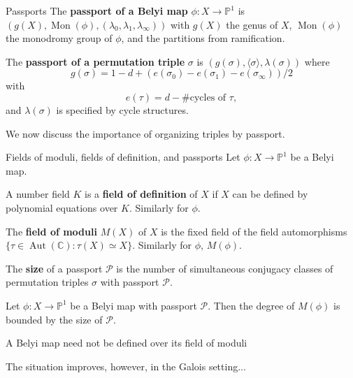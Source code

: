 \documentclass[xcolor=dvipsnames]{beamer}
\theoremstyle{plain}
\newcommand{\PP}{\mathbb P}
\newcommand{\CC}{\mathbb C}
\DeclareMathOperator{\Aut}{Aut}
\DeclareMathOperator{\Mon}{Mon}
\begin{document}
{\begin{frame}{Passports}
      The \textbf{passport of a Belyi map} $\phi:X\to\PP^1$
      is $(g(X), \Mon(\phi), (\lambda_0,\lambda_1,\lambda_\infty))$
      with $g(X)$ the genus of $X$,
      $\Mon(\phi)$ the monodromy group of $\phi$,
      and the partitions from ramification.
      \pause
      \par
      The \textbf{passport of a permutation triple} $\sigma$ is
      $(g(\sigma), \langle\sigma\rangle, \lambda(\sigma))$
      where
      $$
      g(\sigma) = 1-d+(e(\sigma_0)-e(\sigma_1)-e(\sigma_\infty))/2
      $$
      with
      $$
      e(\tau) = d-\#\text{cycles of }\tau,
      $$
      and $\lambda(\sigma)$ is specified by cycle structures.
      \pause
      \par
      We now discuss the importance of organizing triples by passport.
    \end{frame}
    \begin{frame}{Fields of moduli, fields of definition, and passports}
      Let $\phi\colon X\to\PP^1$ be a Belyi map.
      \pause\par
      A number field $K$ is a
      \textbf{field of definition} of $X$
      if $X$ can be defined by polynomial
      equations over $K$.
      Similarly for $\phi$.
      \pause\par
      The \textbf{field of moduli}
      $M(X)$
      of $X$ is
      the fixed field of the field
      automorphisms
      $\{\tau\in\Aut(\CC) : \tau(X)\simeq X\}$.
      Similarly for $\phi$, $M(\phi)$.
      \pause\par
      The \textbf{size} of a passport $\mathcal{P}$
      is the number of simultaneous conjugacy classes
      of permutation triples $\sigma$ with passport
      $\mathcal{P}$.
      \pause
      \begin{theorem}
        Let $\phi\colon X\to\PP^1$ be a
        Belyi map with passport $\mathcal{P}$.
        Then the degree of $M(\phi)$ is
        bounded by the size of $\mathcal{P}$.
      \end{theorem}
      \pause
      A Belyi map need not be defined
      over its field of moduli
      \rWalley
      \pause\par
      The situation improves, however,
      in the Galois setting...
    \end{frame}
}
\end{document}
